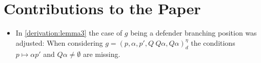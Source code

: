 \section{Contributions to the Paper}

\begin{itemize}
\item In \ref{derivation:lemma3} the case of $g$ being a defender branching position was adjusted: 
When considering $g=(p,\alpha ,p', Q \ Q \alpha, Q \alpha)_d^\eta$ the conditions $p \mapsto \alpha p'$ and $Q \alpha \neq \emptyset$ are 
missing. 
\end{itemize}
